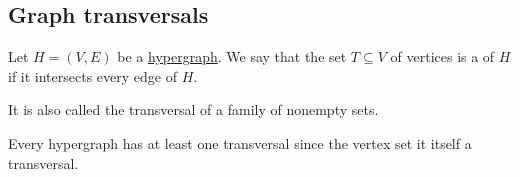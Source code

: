 \subsection{Graph transversals}\label{subsec:graph_transversals}

\begin{definition}\label{def:graph/hypergraph_transversal}
  Let \( H = (V, E) \) be a \hyperref[def:graph/hypergraph]{hypergraph}. We say that the set \( T \subseteq V \) of vertices is a  of \( H \) if it intersects every edge of \( H \).

  It is also called the transversal of a family of nonempty sets.
\end{definition}

\begin{example}\label{ex:hypergraph_vertex_set_is_transversal}
  Every hypergraph has at least one transversal since the vertex set it itself a transversal.
\end{example}

